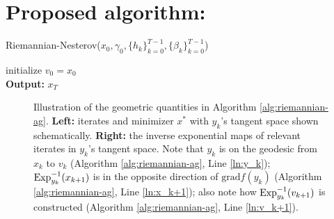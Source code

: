 \section{Proposed algorithm: \ragd}
\begin{algorithm}[hbtp]
	\caption{Riemannian-Nesterov($x_0, \gamma_0, \{h_k\}_{k=0}^{T-1}, \{\beta_k\}_{k=0}^{T-1}$)} \label{alg:riemannian-ag}
	\SetAlgoLined
	initialize $v_0 = x_0$\\
	{\bf Output:} $x_T$
\end{algorithm}

\begin{figure}[hbt]
	\centering \def\svgwidth{200pt}
	 \def\svgwidth{200pt} 
	
	\caption{Illustration of the geometric quantities in Algorithm \ref{alg:riemannian-ag}. \textbf{Left:} iterates and minimizer $x^*$ with $y_{k}$'s tangent space shown schematically. \textbf{Right:} the inverse exponential maps of relevant iterates in $y_{k}$'s tangent space. Note that $y_k$ is on the geodesic from $x_k$ to $v_k$ (Algorithm \ref{alg:riemannian-ag}, Line \ref{ln:y_k}); $\mathrm{Exp}_{y_k}^{-1}(x_{k+1})$ is in the opposite direction of $\mathrm{grad} f(y_k)$ (Algorithm \ref{alg:riemannian-ag}, Line \ref{ln:x_k+1}); also note how $\mathrm{Exp}_{y_k}^{-1}(v_{k+1})$ is constructed (Algorithm \ref{alg:riemannian-ag}, Line \ref{ln:v_k+1}).}
\end{figure}

